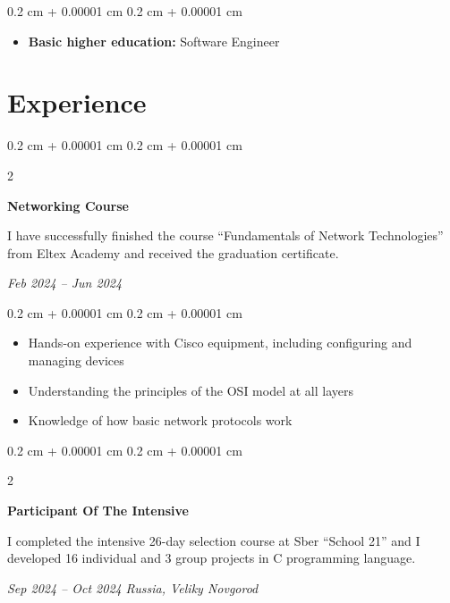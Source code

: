 \documentclass[10pt, letterpaper]{article}
\newenvironment{highlights}{
    \begin{itemize}[
        topsep=0.20 cm,
        parsep=0.20 cm,
        partopsep=0pt,
        itemsep=0pt,
        leftmargin=0.4 cm + 10pt
    ]
}{
    \end{itemize}
} %
\newenvironment{onecolentry}{
    \begin{adjustwidth}{
        0.2 cm + 0.00001 cm
    }{
        0.2 cm + 0.00001 cm
    }
}{
    \end{adjustwidth}
} %
\newenvironment{twocolentry}[2][]{
    \onecolentry
    \def\secondColumn{#2}
    \setcolumnwidth{\fill, 4.5 cm}
    \begin{paracol}{2}
}{
    \switchcolumn \raggedleft \secondColumn
    \end{paracol}
    \endonecolentry
} %
\begin{document}
        \vspace{0.10 cm}
        \begin{onecolentry}
            \begin{highlights}

                \item \textbf{Basic higher education:} Software Engineer
            \end{highlights}
        \end{onecolentry}

    \section{Experience}

    \begin{twocolentry}{
        \textit{Feb 2024 – Jun 2024}}
        
            \textbf{Networking Course}
                \item I have successfully finished the course “Fundamentals of Network Technologies” from Eltex Academy and received the graduation certificate.

            \textit{}
        \end{twocolentry}

        \begin{onecolentry}
            \begin{highlights}
                \item Hands-on experience with Cisco equipment, including configuring and managing devices
                \item Understanding the principles of the OSI model at all layers
                \item Knowledge of how basic network protocols work

            \end{highlights}
        \end{onecolentry}

    \vspace{0.5 cm}
    \begin{twocolentry}{
        \textit{Sep 2024 – Oct 2024}
        \textit{Russia, Veliky Novgorod}}
        
            \textbf{Participant Of The Intensive}
                \item I completed the intensive 26-day selection course at Sber “School 21” and I developed 16 individual and 3 group projects in C programming language.

            \textit{}
        \end{twocolentry}
\end{document}
